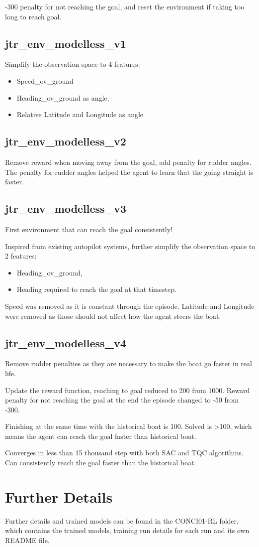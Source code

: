 -300 penalty for not reaching the goal, and reset the environment if taking too long to reach goal.

\subsection*{jtr\_env\_modelless\_v1}
Simplify the observation space to 4 features:
\begin{itemize}
    \item Speed\_ov\_ground
    \item Heading\_ov\_ground as angle,
    \item Relative Latitude and Longitude as angle
\end{itemize}

\subsection*{jtr\_env\_modelless\_v2}
Remove reward when moving away from the goal, add penalty for rudder angles. The penalty for rudder angles helped the agent to learn that the going straight is faster.

\subsection*{jtr\_env\_modelless\_v3}
First environment that can reach the goal consistently!

Inspired from existing autopilot systems, further simplify the observation space to 2 features:
\begin{itemize}
    \item Heading\_ov\_ground,
    \item Heading required to reach the goal at that timestep.
\end{itemize}
Speed was removed as it is constant through the episode. Latitude and Longitude were removed as those should not affect how the agent steers the boat.

\subsection*{jtr\_env\_modelless\_v4}
Remove rudder penalties as they are necessary to make the boat go faster in real life.

Update the reward function, reaching to goal reduced to 200 from 1000. Reward penalty for not reaching the goal at the end the episode changed to -50 from -300.

Finishing at the same time with the historical boat is 100. Solved is >100, which means the agent can reach the goal faster than historical boat.

Converges in less than 15 thousand step with both SAC and TQC algorithms. Can consistently reach the goal faster than the historical boat.

\section*{Further Details}
Further details and trained models can be found in the CONCI01-RL folder, which contains the trained models, training run details for each run and its own README file.